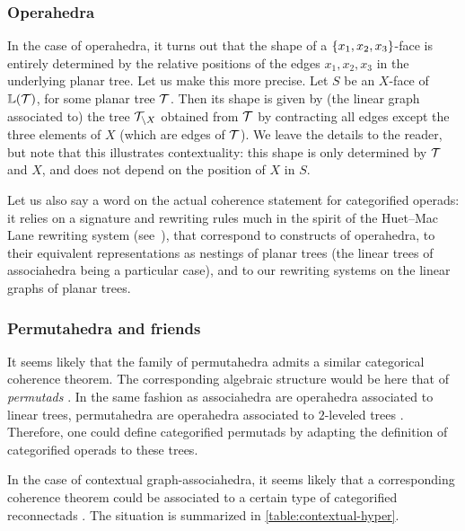 
\subsubsection{Operahedra}
In the case of operahedra, it turns out that the shape of a $\left\{x_1,x_2,x_3\right\}$-face is entirely determined by the relative positions of the edges $x_1,x_2,x_3$ in the underlying  planar tree.  Let us make this more precise.
Let $S$ be an $X$-face of $\mathbb{L}({\cal T})$, for some  planar tree $\cal T$. Then its shape is given by (the linear graph associated to)  the tree ${\cal T}_{\setminus X}$ obtained from  ${\cal T}$  by contracting all edges except the three elements of $X$ (which are edges of ${\cal T}$).  We leave the details to the reader, but note that
this illustrates contextuality: this shape is only determined by ${\cal T}$ and $X$, and does not depend on the position of $X$ in $S$.

Let us also say a word on the actual coherence statement for categorified operads: it relies on a signature and rewriting rules much in the spirit of the Huet--Mac Lane rewriting system (see~\cite{DP15,laplante-anfossiDiagonalOperahedra2022a,CLA1}), that correspond to constructs of operahedra, to their equivalent representations as nestings of planar trees (the linear trees of associahedra being a particular case), and to our rewriting systems on the linear graphs of planar trees. 


\subsubsection{Permutahedra and friends}
It seems likely that the family of permutahedra admits a similar categorical coherence theorem. 
The corresponding algebraic structure would be here that of \emph{permutads} \cite{LodayRonco11,Markl19}. 
In the same fashion as associahedra are operahedra associated to linear trees, permutahedra are operahedra associated to $2$-leveled trees \cite{laplante-anfossiDiagonalOperahedra2022a}.
Therefore, one could define categorified permutads by adapting the definition of categorified operads \cite{CLA1} to these trees.

In the case of contextual graph-associahedra, it seems likely that a corresponding coherence theorem could be associated to a certain type of categorified reconnectads \cite{DotsenkoKeilthyLyskov}.
The situation is summarized in \cref{table:contextual-hyper}.

